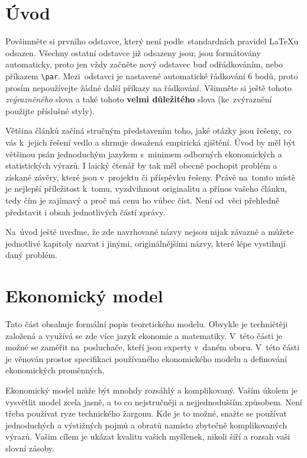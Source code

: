 \documentclass[12pt,a4paper,oneside,final]{article}
\theoremstyle{definition}
\theoremstyle{remark}
\numberwithin{equation}{section}
\begin{document}
\VytvorTitulniStranu

\section{Úvod}

\cite{cipra} \cite{brockwell_ts}Povšimněte si prvního odstavce, který není podle~standardních pravidel \LaTeX{u} odsazen. Všechny ostatní odstavce již odsazeny jsou; jsou formátovány automaticky, proto jen vždy začněte nový odstavec buď odřádkováním, nebo příkazem \verb|\par|. Mezi~odstavci je nastavené automatické řádkování 6 bodů, proto prosím nepoužívejte žádné další příkazy na řádkování. Všimněte si ještě tohoto \emph{zvýrazněného} slova a také tohoto \textbf{velmi důležitého} slova (ke~zvýraznění použijte příslušné styly).

Většina článků začíná stručným představením toho, jaké otázky jsou řešeny, co vás k~jejich řešení vedlo a shrnuje dosažená empirická zjištění. Úvod by  měl být většinou psán jednoduchým  jazykem s~minimem odborných ekonomických a statistických výrazů. I laický čtenář by tak měl obecně pochopit problém a získané závěry, které jsou v~projektu či příspěvku řešeny. Právě na~tomto místě je nejlepší příležitost k~tomu, vyzdvihnout originalitu a přínos vašeho článku, tedy čím je zajímavý a proč má cenu ho vůbec číst. Není od~věci přehledně představit i obsah jednotlivých částí zprávy.

Na~úvod ještě uveďme, že zde navrhované názvy nejsou nijak závazné a můžete jednotlivé kapitoly nazvat i jinými, originálnějšími názvy, které lépe vystihují daný problém. 

\section{Ekonomický model}

Tato část obsahuje formální popis teoretického modelu. Obvykle je techničtěji založená a využívá se zde více jazyk ekonomie a matematiky. V~této části je možné se zaměřit na~posluchače, kteří jsou experty v~daném oboru. V~této části je věnován prostor specifikaci používaného ekonomického modelu a definování ekonomických proměnných.

Ekonomický model může být mnohdy rozsáhlý a komplikovaný. Vaším úkolem je vysvětlit model zcela jasně, a to co nejstručněji a nejjednodušším způsobem. Není třeba používat ryze technického žargonu. Kde je to možné, snažte se používat jednoduchých a výstižných pojmů a obratů namísto zbytečně komplikovaných výrazů. Vašim cílem je ukázat kvalitu vašich myšlenek, nikoli šíří a rozsah vaši slovní zásoby.
\end{document}

